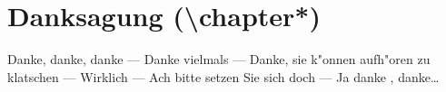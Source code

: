 \documentclass[nochapterpage,bigchapter,linedtoc,longdoc,colorback,accentcolor=tud4c]{tudreport}
\begin{document}
  \chapter*{Danksagung (\textbackslash chapter*)}    \noindent
      Danke, danke, danke --- Danke vielmals --- Danke, sie k"onnen aufh"oren zu klatschen ---
      Wirklich --- Ach bitte setzen Sie sich doch --- Ja danke , danke\dots

  \listoffigures{}
\end{document}
